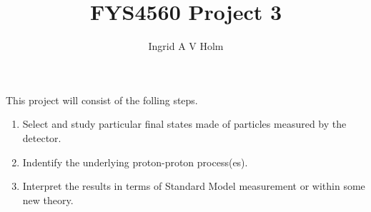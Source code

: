 \documentclass[11pt]{article}
\begin{document}
\title{FYS4560 Project 3}
\author{Ingrid A V Holm}
\maketitle

\begin{multicols}{2}
This project will consist of the folling steps.
\begin{enumerate}
\item Select and study particular final states made of particles measured by the detector.
\item Indentify the underlying proton-proton process(es).
\item Interpret the results in terms of Standard Model measurement or within some new theory.
\end{enumerate}
\end{multicols}
\end{document}

